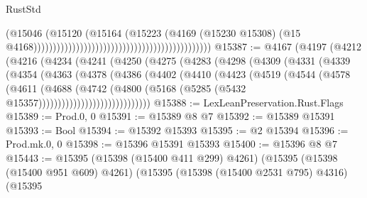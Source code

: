 \begin{lexlean}{RustStd}
\begin{coremodule}
                                                                                    (@15046
                                                                                      (@15120
                                                                                        (@15164
                                                                                          (@15223
                                                                                            (@4169
                                                                                              (@15230
                                                                                                @15308)
                                                                                              (@15
                                                                                                @4168))))))))))))))))))))))))))))))))))))))))))))))
@15387 := @4167
    (@4197
      (@4212
        (@4216
          (@4234
            (@4241
              (@4250
                (@4275
                  (@4283
                    (@4298
                      (@4309
                        (@4331
                          (@4339
                            (@4354
                              (@4363
                                (@4378
                                  (@4386
                                    (@4402
                                      (@4410
                                        (@4423
                                          (@4519
                                            (@4544
                                              (@4578
                                                (@4611
                                                  (@4688
                                                    (@4742
                                                      (@4800
                                                        (@5168
                                                          (@5285
                                                            (@5432
                                                              @15357)))))))))))))))))))))))))))))
@15388 := LexLeanPreservation.Rust.Flags
@15389 := Prod.{0, 0}
@15391 := @15389 @8 @7
@15392 := @15389 @15391
@15393 := Bool
@15394 := @15392 @15393
@15395 := @2 @15394
@15396 := Prod.mk.{0, 0}
@15398 := @15396 @15391 @15393
@15400 := @15396 @8 @7
@15443 := @15395
    (@15398 (@15400 @411 @299) @4261)
    (@15395
      (@15398 (@15400 @951 @609) @4261)
      (@15395
        (@15398 (@15400 @2531 @795) @4316)
        (@15395

\end{coremodule}
\end{lexlean}
